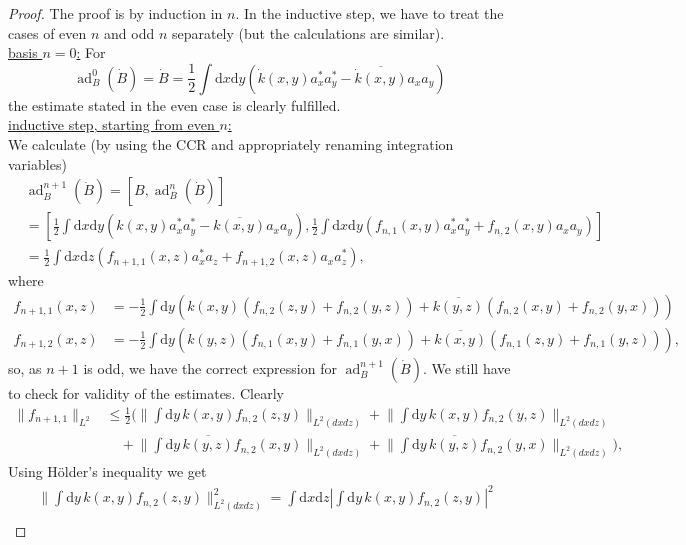 \documentclass[11pt,a4paper,draft,DIV11]{scrartcl}	%
\newcommand{\ad}{\operatorname{ad}}	%
\newcommand{\di}{\textrm{d}}		%
\newcommand{\cc}[1]{\overline{#1}}	%
\newcommand{\norm}[1]{\lVert#1\rVert}	%
\newcommand{\be}[1]{\begin{equation}\label{eq:#1}}	%
\newcommand{\ee}{\end{equation}}
\newcommand{\bd}{\begin{displaymath}}			%
\newcommand{\ed}{\end{displaymath}}
\begin{document}
\begin{proof} The proof is by induction in $n$. In the inductive step, we have to treat the cases of even $n$ and odd $n$ separately (but the calculations are similar).\\
\underline{basis $n=0$:} For
\bd
\ad^0_B(\dot B) = \dot B = \frac{1}{2}\int \di x\di y\left( \dot k(x,y) a^\ast_x a^\ast_y - \cc{\dot k(x,y)} a_x a_y \right)
\ed
the estimate stated in the even case is clearly fulfilled.\\
\underline{inductive step, starting from even $n$:}\\
We calculate (by using the CCR and appropriately renaming integration variables)
\begin{align*}
& \ad^{n+1}_B(\dot B) = [B,\ad^n_B(\dot B)] \\
& = \left[\frac{1}{2} \int \di x\di y\left( k(x,y)a^\ast_x a^\ast_y - \cc{k(x,y)}a_x a_y \right), \frac{1}{2}\int \di x\di y\left( f_{n,1}(x,y) a^\ast_x a^\ast_y + f_{n,2}(x,y) a_x a_y \right)\right] \\
& = \frac{1}{2} \int \di x\di z \left(f_{n+1,1}(x,z) a^\ast_x a_z + f_{n+1,2}(x,z) a_x a^\ast_z \right),
\end{align*}
where
\begin{equation}
\label{eq:even}
\begin{split}
f_{n+1,1}(x,z) & = -\frac{1}{2} \int \di y \left( k(x,y) \left( f_{n,2}(z,y) + f_{n,2}(y,z) \right) + \cc{k(y,z)}\left( f_{n,2}(x,y) + f_{n,2}(y,x)\right) \right)\\
f_{n+1,2}(x,z) & = -\frac{1}{2} \int \di y \left( k(y,z) \left( f_{n,1}(x,y) + f_{n,1}(y,x) \right) + \cc{k(x,y)}\left( f_{n,1}(z,y) + f_{n,1}(y,z)\right) \right), 
\end{split}
\end{equation}
so, as $n+1$ is odd, we have the correct expression for $\ad^{n+1}_B(\dot B)$. We still have to check for validity of the estimates.
Clearly
\be{normnorm}
\begin{split}
\norm{f_{n+1,1}}_{L^2} & \leq \frac{1}{2} \bigg( \norm{\int \di y\, k(x,y) f_{n,2}(z,y)}_{L^2(dxdz)} + \norm{\int \di y\, k(x,y) f_{n,2}(y,z)}_{L^2(dxdz)} \\
& \quad + \norm{\int \di y\, \cc{k(y,z)}f_{n,2}(x,y)}_{L^2(dxdz)} + \norm{\int \di y\, \cc{k(y,z)} f_{n,2}(y,x)}_{L^2(dxdz)} \bigg),
\end{split}
\ee
Using H\"older's inequality we get
\begin{align*}
& \norm{\int \di y\,k(x,y) f_{n,2}(z,y)}^2_{L^2(dxdz)} = \int \di x\di z \left\lvert \int \di y\,k(x,y) f_{n,2}(z,y) \right\rvert^2 \\

\end{align*}
\end{proof}
\end{document}
